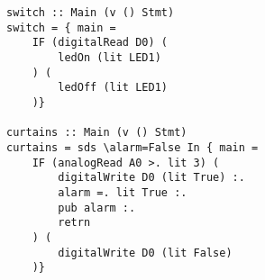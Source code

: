 \begin{lstlisting}[caption=Examples of mTask tasks,captionpos=b,label=mtask_examples]
switch :: Main (v () Stmt) 
switch = { main = 
	IF (digitalRead D0) (
		ledOn (lit LED1)
	) (
		ledOff (lit LED1)
	)}
	
curtains :: Main (v () Stmt)
curtains = sds \alarm=False In { main = 
	IF (analogRead A0 >. lit 3) (
		digitalWrite D0 (lit True) :.
		alarm =. lit True :.
		pub alarm :.
		retrn
	) (
		digitalWrite D0 (lit False)
	)}
\end{lstlisting}

